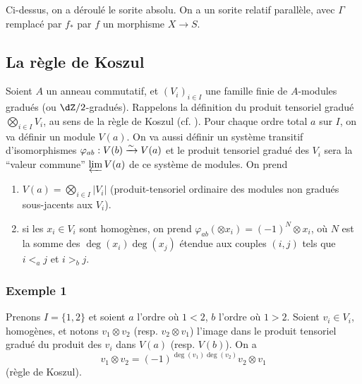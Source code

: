 \subsubsection{}\label{IV:1-2-6}

Ci-dessus, on a déroulé le sorite absolu. On a un sorite relatif 
parallèle, avec $\Gamma$ remplacé par $f_*$ par $f$ un morphisme $X\to S$. 










\subsection{La règle de Koszul}\label{IV:1-3}

Soient $A$ un anneau commutatif, et $(V_i)_{i\in I}$ une famille finie de 
$A$-modules gradués (ou $\dZ/2$-gradués). Rappelons la définition du 
produit tensoriel gradué $\bigotimes_{i\in I} V_i$, au sens de la règle de 
Koszul (cf. \cite[XVII 1.1]{sga4}). Pour chaque ordre total $a$ sur $I$, on va 
définir un module $V(a)$. On va aussi définir un système transitif 
d'isomorphismes $\varphi_{a b}:V(b)\xrightarrow\sim V(a)$ et le produit tensoriel 
gradué des $V_i$ sera la ``valeur commune'' $\varprojlim V(a)$ de ce 
système de modules. On prend 
\begin{enumerate}[\indent a)]
  \item $V(a) = \bigotimes_{i\in I} |V_i|$ (produit-tensoriel ordinaire des 
    modules non gradués sous-jacents aux $V_i$).
  \item si les $x_i\in V_i$ sont homogènes, on prend 
    $\varphi_{a b}(\otimes x_i) = (-1)^N \otimes x_i$, où $N$ est la somme 
    des $\deg(x_i)\deg(x_j)$ étendue aux couples $(i,j)$ tels que 
    $i<_a j$ et $i>_b j$.
\end{enumerate}





\subsubsection*{Exemple 1}

Prenons $I=\{1,2\}$ et soient $a$ l'ordre où $1<2$, $b$ l'ordre où $1>2$. 
Soient $v_i\in V_i$, homogènes, et notons $v_1\otimes v_2$ (resp. 
$v_2\otimes v_1$) l'image dans le produit tensoriel gradué du produit des 
$v_i$ dans $V(a)$ (resp. $V(b)$). On a 
\[
  v_1\otimes v_2 = (-1)^{\deg(v_1)\deg(v_2)} v_2\otimes v_1
\]
(règle de Koszul). 





